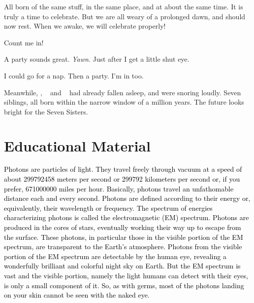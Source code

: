 \documentclass[main.tex]{subfiles}
\begin{document}
\par \Maia All born of the same stuff, in the same place, and at about the same time.  It is truly a time to celebrate.  But we are all weary of a prolonged dawn, and should now rest.  When we awake, we will celebrate properly!

\par \Merope  Count me in!  

\par \Electra A party sounds great. \textit{Yawn}. Just after I get a little shut eye.

\par \Sterope I could go for a nap. Then a party.  I'm in too.

\par \nar Meanwhile, \rmtaygete, \rmalcyone~ and \rmcelaeno~ had already fallen asleep, and were snoring loudly.  Seven siblings, all born within the narrow window of a million years.  The future looks bright for the Seven Sisters.

\section{Educational Material}


\begin{tcolorbox}[sharp corners, colback=blue!30, colframe=blue!80!blue, title=Box \refstepcounter{educhap1}\label{boxchap1:photons}\ref{boxchap1:photons} -- Photons] 
\par \textcolor{black}{Photons are particles of light.  They travel freely through vacuum at a speed of about 299792458 meters per second or 299792 kilometers per second or, if you prefer, 671000000 miles per hour.  Basically, photons travel an unfathomable distance each and every second.  Photons are defined according to their energy or, equivalently, their wavelength or frequency.  The spectrum of energies characterizing photons is called the electromagnetic (EM) spectrum.  Photons are produced in the cores of stars, eventually working their way up to escape from the surface.  These photons, in particular those in the visible portion of the EM spectrum, are transparent to the Earth's atmosphere.  Photons from the visible portion of the EM spectrum are detectable by the human eye, revealing a wonderfully brilliant and colorful night sky on Earth.  But the EM spectrum is vast and the visible portion, namely the light humans can detect with their eyes, is only a small component of it.  So, as with germs, most of the photons landing on your skin cannot be seen with the naked eye.}
\end{tcolorbox}
\end{document}
